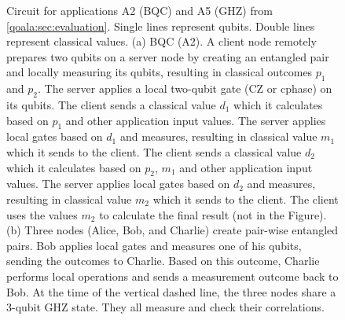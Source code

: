 \begin{figure}[t]
    \centering

    \vspace{1cm}
    \vspace{1cm}

    \caption{
    Circuit for applications A2 (BQC) and A5 (GHZ) from \cref{qoala:sec:evaluation}.
    Single lines represent qubits. Double lines represent classical values.
    (a) BQC (A2). A client node remotely prepares two qubits on a server node by creating an entangled pair and locally measuring its qubits, resulting in classical outcomes $p_1$ and $p_2$.
    The server applies a local two-qubit gate (CZ or cphase) on its qubits.
    The client sends a classical value $d_1$ which it calculates based on $p_1$ and other application input values.
    The server applies local gates based on $d_1$ and measures, resulting in classical value $m_1$ which it sends to the client.
    The client sends a classical value $d_2$ which it calculates based on $p_2$, $m_1$ and other application input values.
    The server applies local gates based on $d_2$ and measures, resulting in classical value $m_2$ which it sends to the client.
    The client uses the values $m_2$ to calculate the final result (not in the Figure).
    (b) Three nodes (Alice, Bob, and Charlie) create pair-wise entangled pairs. Bob applies local gates and measures one of his qubits, sending the outcomes to Charlie.
    Based on this outcome, Charlie performs local operations and sends a measurement outcome back to Bob.
    At the time of the vertical dashed line, the three nodes share a 3-qubit GHZ state. They all measure and check their correlations.
    }
    \label{qoala:fig:app:circuits_2}
\end{figure}



